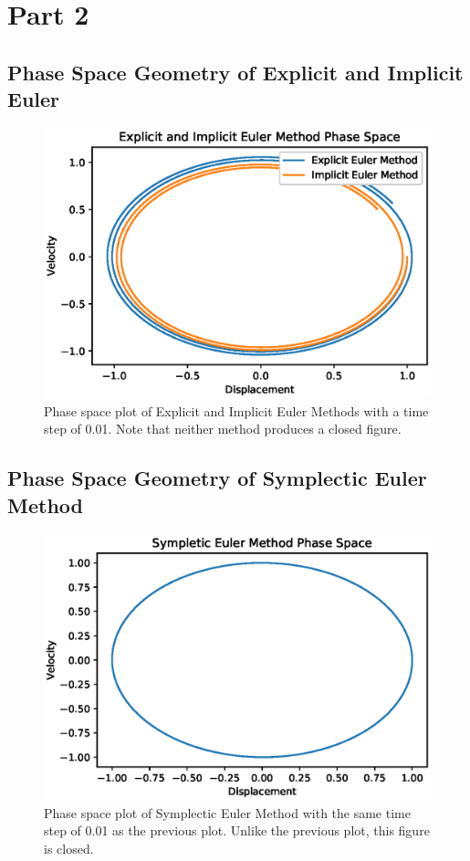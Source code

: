 \documentclass{article}
\begin{document}
\break

\section{Part 2}


\subsection{Phase Space Geometry of Explicit and Implicit Euler}

\begin{figure}[ht]
\centering
\includegraphics[scale=0.35]{exp_imp_phase.eps}
\caption{Phase space plot of Explicit and Implicit Euler Methods with a time step of 0.01. Note that neither method produces a closed figure.}
\label{fig:expimpphase}
\end{figure}

\subsection{Phase Space Geometry of Symplectic Euler Method}

\begin{figure}[ht]
\centering
\includegraphics[scale=0.35]{symp_phase.eps}
\caption{Phase space plot of Symplectic Euler Method with the same time step of 0.01 as the previous plot. Unlike the previous plot, this figure is closed.}
\label{fig:sympphase}
\end{figure}
\end{document}
